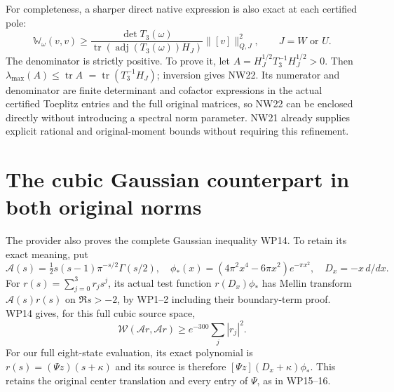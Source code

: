 \documentclass[11pt]{article}
\newcommand{\W}{\mathcal W}
\newcommand{\tr}{\operatorname{tr}}
\begin{document}
For completeness, a sharper direct native expression is
also exact at each certified pole:
\[
 \mathbb W_\omega(v,v)\ge
 \frac{\det T_3(\omega)}{\tr(\operatorname{adj}(T_3(\omega))H_J)}
                         \|[v]\|_{Q,J}^2,
 \qquad J=W\text{ or }U.
 \tag{NW22}
\]
The denominator is strictly positive. To prove it, let
$A=H_J^{1/2}T_3^{-1}H_J^{1/2}>0$. Then
$\lambda_{\max}(A)\le\tr A$
$=\tr(T_3^{-1}H_J)$; inversion gives NW22.
Its numerator and denominator are finite determinant and
cofactor expressions in the actual certified Toeplitz
entries and the full original matrices, so NW22 can be
enclosed directly without introducing a spectral norm
parameter. NW21 already supplies explicit rational and
original-moment bounds without requiring this refinement.

\section{The cubic Gaussian counterpart in both original norms}
The provider also proves the complete Gaussian inequality
WP14. To retain its exact meaning, put
\[
 \mathcal A(s)=\tfrac12s(s-1)\pi^{-s/2}\Gamma(s/2),\quad
 \phi_*(x)=(4\pi^2x^4-6\pi x^2)e^{-\pi x^2},\quad
 D_x=-x\,d/dx.
 \tag{NW23}
\]
For $r(s)=\sum_{j=0}^3r_js^j$, its actual test function
$r(D_x)\phi_*$ has Mellin transform $\mathcal A(s)r(s)$
on $\Re s>-2$, by WP1--2 including their boundary-term
proof. WP14 gives, for this full cubic source space,
\[
 \W(\mathcal A r,\mathcal A r)\ge e^{-300}\sum_j|r_j|^2.
 \tag{NW24}
\]
For our full eight-state evaluation, its exact polynomial
is $r(s)=(\Psi z)(s+\kappa)$ and its source is therefore
$[\Psi z](D_x+\kappa)\phi_*$. This retains the original
center translation and every entry of $\Psi$, as in WP15--16.
\end{document}
